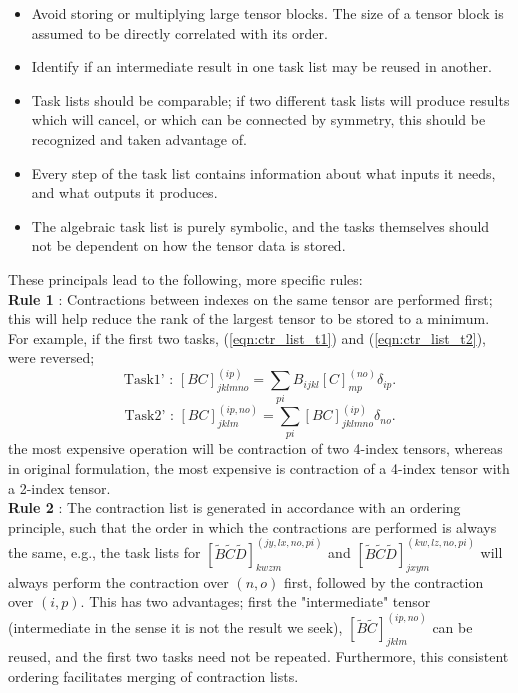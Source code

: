 \begin{itemize}
\item Avoid storing or multiplying large tensor blocks. The size of a tensor block
is assumed to be directly correlated with its order. 
\item Identify if an intermediate result in one task list may be reused in another.
\item Task lists should be comparable; if two different task lists will produce results which will cancel, or which
can be connected by symmetry, this should be recognized and taken advantage of.
\item Every step of the task list contains information about what inputs it needs, and what outputs it produces.
\item The algebraic task list is purely symbolic, and the tasks themselves should not be dependent on
how the tensor data is stored.
\end{itemize}
\noindent These principals lead to the following, more specific rules:\\

\noindent \textbf{Rule 1} : Contractions between indexes on the same tensor are
performed first; this will help reduce the rank of the largest tensor to be stored to
a minimum. For example, if the first two tasks, (\ref{eqn:ctr_list_t1})  and (\ref{eqn:ctr_list_t2}), were reversed;
\begin{equation*}
\text{Task1' \ : \ \ }
[BC]^{(ip)}_{jklmno} = \sum_{pi} B_{ijkl}[C]_{mp}^{(no)}\delta_{ip}.
\end{equation*}
\begin{equation*}
\text{Task2' \ : \ \ }
[BC]^{(ip,no)}_{jklm} = \sum_{pi} [BC]^{(ip)}_{jklmno}\delta_{no}.
\end{equation*}
the most expensive operation will be contraction of two  4-index tensors, whereas in original formulation, the most expensive is contraction of a 4-index tensor with a 2-index tensor.\\

\noindent \textbf{Rule 2} : The contraction list is generated in accordance with an
ordering principle, such that the order in which the contractions are performed
is always the same, e.g.,  the task lists for $[\tilde{B}\tilde{C}\tilde{D}]^{(jy,lx,no,pi)}_{kwzm}$
and $[\tilde{B}\tilde{C}\tilde{D}]^{(kw,lz,no,pi)}_{jxym}$ will always perform the contraction over
$(n,o)$ first, followed by the contraction over $(i,p)$. This has two 
advantages; first the "intermediate" tensor (intermediate in the sense 
it is not the result we seek), $[\tilde{B}\tilde{C}]^{(ip,no)}_{jklm}$ can be reused, and the first two tasks need not be
repeated. Furthermore, this consistent ordering facilitates merging of contraction lists.\\

